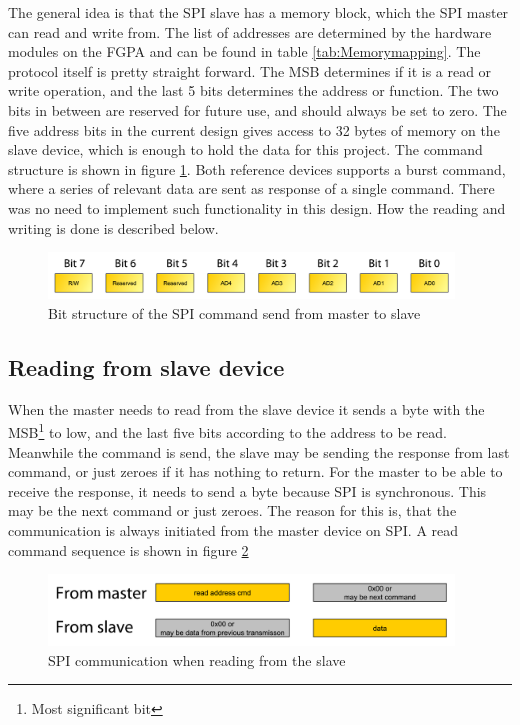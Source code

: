 The general idea is that the SPI slave has a memory block, which the SPI master can read and write from. The list of addresses are determined by the hardware modules on the FGPA and can be found in table \ref{tab:Memorymapping}. The protocol itself is pretty straight forward. The MSB determines if it is a read or write operation, and the last 5 bits determines the address or function. The two bits in between are reserved for future use, and should always be set to zero. The five address bits in the current design gives access to 32 bytes of memory on the slave device, which is enough to hold the data for this project. The command structure is shown in figure \ref{fig:spi_protocol_cmd_structure}. Both reference devices supports a burst command, where a series of relevant data are sent as response of a single command. There was no need to implement such functionality in this design. How the reading and writing is done is described below.
\begin{figure}[htb]
	\centering
	\includegraphics[width=0.96\textwidth,trim=0 0 0 0]{graphics/spi_protocol_cmd_structure.pdf} %
	\caption{Bit structure of the SPI command send from master to slave}
	\label{fig:spi_protocol_cmd_structure}			%
\end{figure}


\subsection{Reading from slave device}
When the master needs to read from the slave device it sends a byte with the MSB\footnote{Most significant bit} to low, and the last five bits according to the address to be read. Meanwhile the command is send, the slave may be sending the response from last command, or just zeroes if it has nothing to return. For the master to be able to receive the response, it needs to send a byte because SPI is synchronous. This may be the next command or just zeroes. The reason for this is, that the communication is always initiated from the master device on SPI. A read command sequence is shown in figure \ref{fig:spi_protocol_command_structure_read} 

\begin{figure}[htb]
	\centering
	\includegraphics[width=0.96\textwidth]{graphics/spi_protocol_command_structure_read_wlabels.pdf} %
	\caption{SPI communication when reading from the slave}
	\label{fig:spi_protocol_command_structure_read}			%
\end{figure}


